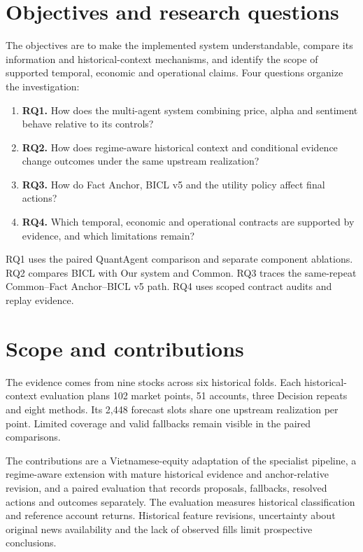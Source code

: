 \section{Objectives and research questions}\label{s:874323025bb68e2c}
The objectives are to make the implemented system understandable, compare
its information and historical-context mechanisms, and identify the scope
of supported temporal, economic and operational claims. Four questions
organize the investigation:
\begin{enumerate}
\item \textbf{RQ1.} How does the multi-agent system combining price, alpha
and sentiment behave relative to its controls?
\item \textbf{RQ2.} How does regime-aware historical context and conditional
evidence change outcomes under the same upstream realization?
\item \textbf{RQ3.} How do Fact Anchor, BICL v5 and the utility policy affect
final actions?
\item \textbf{RQ4.} Which temporal, economic and operational contracts are
supported by evidence, and which limitations remain?
\end{enumerate}
RQ1 uses the paired QuantAgent comparison and separate component
ablations. RQ2 compares BICL with Our system and Common. RQ3 traces the
same-repeat Common--Fact Anchor--BICL v5 path. RQ4 uses scoped contract
audits and replay evidence.

\section{Scope and contributions}\label{s:f1f479eaa6735c4f}
The evidence comes from nine stocks across six historical folds.
Each historical-context evaluation plans 102 market points, 51 accounts,
three Decision repeats and eight methods. Its 2,448 forecast slots share
one upstream realization per point. Limited coverage and valid fallbacks
remain visible in the paired comparisons.

The contributions are a Vietnamese-equity adaptation of the specialist
pipeline, a regime-aware extension with mature historical evidence and
anchor-relative revision, and a paired evaluation that records proposals,
fallbacks, resolved actions and outcomes separately. The evaluation
measures historical classification and reference account returns.
Historical feature revisions, uncertainty about original news
availability and the lack of observed fills limit prospective conclusions.

